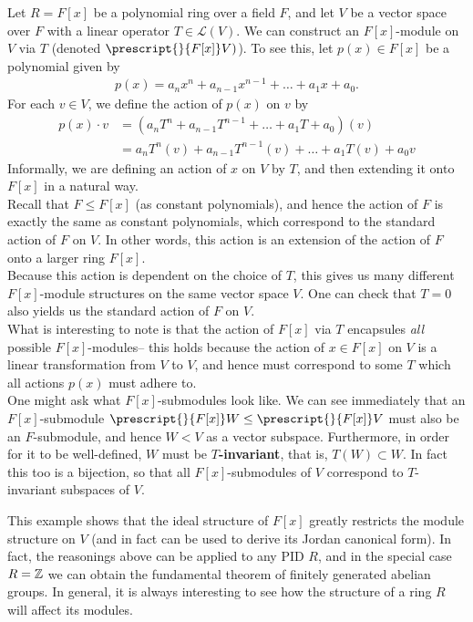 \documentclass{memoir}
\begin{document}
\begin{exmp}[\(F{[}x{]}\) Modules]
	Let \(R = F[x]\) be a polynomial ring over a field \(F\), and let \(V\) be a vector space over \(F\) with a linear operator \(T \in \mathcal{L}(V)\). We can construct an \(F[x]\)-module on \(V\) via \(T\) (denoted \(\prescript{}{F[x]}V)\)). To see this, let \(p(x) \in F[x]\) be a polynomial given by
	\begin{align*}
		p(x) = a_nx^{n}+ a_{n-1}x^{n-1} + \ldots + a_1 x + a_0.
	\end{align*}
	For each \(v \in V\), we define the action of \(p(x)\) on \(v\) by
	\begin{align*}
		p(x)\cdot v &= (a_n T^{n} + a_{n-1}T^{n-1} + \ldots + a_1 T + a_0) (v)\\
		       &= a_n T^{n}(v) + a_{n-1}T^{n-1}(v) + \ldots + a_1 T(v) + a_0v
	\end{align*}
	Informally, we are defining an action of \(x\) on \(V\) by \(T\), and then extending it onto \(F[x]\) in a natural way.\\

	Recall that \(F\leq F[x]\) (as constant polynomials), and hence the action of \(F\) is exactly the same as constant polynomials, which correspond to the standard action of \(F\) on \(V\). In other words, this action is an extension of the action of \(F\) onto a larger ring \(F[x]\).\\

	Because this action is dependent on the choice of  \(T\), this gives us many different \(F[x]\)-module structures on the same vector space \(V\). One can check that \(T=0\) also yields us the standard action of \(F\) on \(V\).\\

	What is interesting to note is that the action of \(F[x]\) via \(T\) encapsules \textit{all} possible \(F[x]\)-modules-- this holds because the action of \(x \in F[x]\) on \(V\) is a linear transformation from \(V\) to \(V\), and hence must correspond to some \(T\) which all actions \(p(x)\) must adhere to.\\

	One might ask what \(F[x]\)-submodules look like. We can see immediately that an \(F[x]\)-submodule \(\prescript{}{F[x]}W \leq \prescript{}{F[x]}V\) must also be an \(F\)-submodule, and hence \(W<V\) as a vector subspace. Furthermore, in order for it to be well-defined, \(W\) must be \textbf{\(T\)-invariant}, that is, \(T(W) \subset  W\). In fact this too is a bijection, so that all \(F[x]\)-submodules of \(V\) correspond to \(T\)-invariant subspaces of \(V\).
\end{exmp}
This example shows that the ideal structure of \(F[x]\) greatly restricts the module structure on \(V\) (and in fact can be used to derive its Jordan canonical form). In fact, the reasonings above can be applied to any PID \(R\), and in the special case \(R = \mathbb{Z}\) we can obtain the fundamental theorem of finitely generated abelian groups. In general, it is always interesting to see how the structure of a ring \(R\) will affect its modules.
\end{document}
